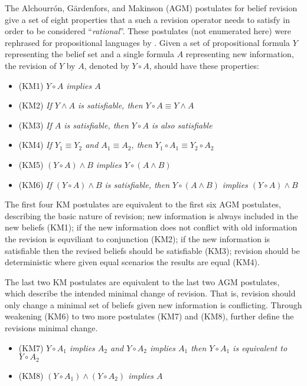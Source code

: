 The Alchourrón, G\"ardenfors, and Makinson (AGM) \cite{alchourron1985logic} postulates for belief revision give a set of eight properties 
that a such a revision operator needs to satisfy in order to be considered ``\textit{rational}''.
These postulates (not enumerated here) were rephrased for propositional languages by \cite{katsuno1991propositional}. 
Given a set of propositional formula $Y$ representing the belief set and a single formula $A$ representing new information, the revision of $Y$ by $A$, denoted by $Y \circ A$,
should have these properties:

\begin{itemize}
  \item (KM1) \textit{ $Y \circ A$  implies $A$}
  \item (KM2) \textit{ If $Y \wedge A$  is satisfiable, then $Y \circ A \equiv Y \wedge A$}
  \item (KM3) \textit{ If $A$ is satisfiable, then $Y \circ A$  is also satisfiable}
  \item (KM4) \textit{ If $Y_1 \equiv Y_2$ and $A_1 \equiv A_2$, then $Y_1 \circ A_1 \equiv Y_2 \circ A_2$}
  \item (KM5) \textit{ $(Y \circ A) \wedge B$  implies $Y \circ (A \wedge B)$}
  \item (KM6) \textit{ If $(Y \circ A) \wedge B$ is satisfiable, then $Y \circ (A \wedge B)$ implies $(Y \circ A) \wedge B$}
\end{itemize} 

The first four KM postulates are equivalent to the first six AGM postulates, describing the basic nature of revision;
new information is always included in the new beliefs (KM1); if the new information does not conflict with old information the revision is equviliant to conjunction (KM2);
if the new information is satisfiable then the revised beliefs should be satisfiable (KM3); revision should be deterministic where given equal scenarios the results are equal (KM4).

The last two KM postulates are equivalent to the last two AGM postulates, which describe the intended minimal change of revision.
That is, revision should only change a minimal set of beliefs given new information is conflicting.
Through weakening (KM6) to two more postulates (KM7) and (KM8), \cite{katsuno1991propositional} further define the revisions minimal change.

\begin{itemize}
  \item (KM7) \textit{ $Y \circ A_1$  implies $A_2$ and $Y \circ A_2$ implies $A_1$ then $Y \circ A_1$ is equivalent to $Y \circ A_2$}
  \item (KM8) \textit{ $(Y \circ A_1) \wedge (Y \circ A_2)$ implies $A$}
\end{itemize}

